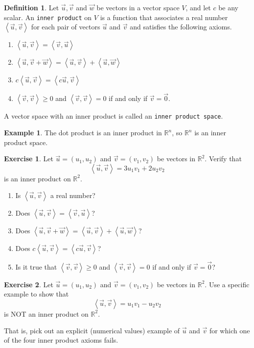 \documentclass{beamer}
\newcommand{\R}{\mathbb{R}}
\newcommand{\vecu}{\vec{u}}
\newcommand{\fn}{\insertframenumber}
\newcommand{\ip}[2]{\left\langle #1,#2\right\rangle}
\theoremstyle{definition}
\newtheorem{exercise}{Exercise}
\newtheorem*{defn}{Definition}
\newtheorem*{exa}{Example}
\renewcommand{\emph}[1]{{\color{blue}\texttt{#1}}}
\begin{document}
\begin{frame}{\fn}
	\begin{defn}
		Let $\vec u,\vec v$ and $\vec w$ be vectors in a vector space $V$, and let $c$ be any scalar.  An \emph{inner product} on $V$ is a function that associates a real number $\ip{\vecu}{\vec v}$ for each pair of vectors $\vec u$ and $\vec v$ and satisfies the following axioms.
		\begin{enumerate}[label=\textbf{\arabic*.}]
			\item $\ip{\vec u}{\vec v}=\ip{\vec v}{\vec u}$
			\item $\ip{\vec u}{\vec v+\vec w}=\ip{\vec u}{\vec v}+\ip{\vec u}{\vec w}$
			\item $c\ip{\vec u}{\vec v}=\ip{c\vec u}{\vec v}$
			\item $\ip{\vec v}{\vec v}\geq 0$ and $\ip{\vec v}{\vec v}=0$ if and only if $\vec v=\vec 0$.
		\end{enumerate}
	
		A vector space with an inner product is called an \emph{inner product space}.
	\end{defn}
	\begin{exa}
		The dot product is an inner product in $\R^n$, so $\R^n$ is an inner product space.
	\end{exa}
\end{frame}
\begin{frame}{\fn}
	\begin{exercise}
		Let $\vec u=(u_1,u_2)$ and $\vec v=(v_1,v_2)$ be vectors in $\R^2$.  Verify that
			\[\ip{\vec u}{\vec v}=3u_1v_1+2u_2v_2\]
		is an inner product on $\R^2$.  
		\begin{enumerate}[label=(\alph*)]
			\item Is $\ip{\vec{u}}{\vec{v}}$ a real number?
			\item Does $\ip{\vec u}{\vec v}=\ip{\vec v}{\vec u}$?
			\item Does $\ip{\vec u}{\vec v+\vec w}=\ip{\vec u}{\vec v}+\ip{\vec u}{\vec w}$?
			\item Does $c\ip{\vec u}{\vec v}=\ip{c\vec u}{\vec v}$?
			\item Is it true that $\ip{\vec v}{\vec v}\geq 0$ and $\ip{\vec v}{\vec v}=0$ if and only if $\vec v=\vec 0$?
		\end{enumerate}
	\end{exercise}
\end{frame}
\begin{frame}{\fn}
	\begin{exercise}
		Let $\vec u=(u_1,u_2)$ and $\vec v=(v_1,v_2)$ be vectors in $\R^2$.  Use a specific example to show that
		\[\ip{\vec u}{\vec v}=u_1v_1-u_2v_2\]
		is NOT an inner product on $\R^2$.  
		
		That is, pick out an explicit (numerical values) example of $\vec{u}$ and $\vec{v}$ for which one of the four inner product axioms fails.
	\end{exercise}
\end{frame}
\end{document}
